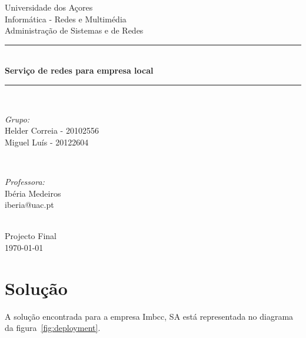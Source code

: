 \documentclass[12pt,a4paper]{report}
\begin{document}
\begin{titlepage}

\newcommand{\HRule}{\rule{\linewidth}{0.5mm}} %

\center

\LARGE Universidade dos Açores\\[0.5cm]
\Large Informática - Redes e Multimédia\\[1.5cm]
\large Administração de Sistemas e de Redes\\[0.5cm]

\HRule \\[0.4cm]
{ \LARGE \bfseries Serviço de redes para empresa local}\\[0.4cm]
\HRule \\[1.5cm]

\begin{minipage}{0.4\textwidth}
\begin{flushleft} \large
\emph{Grupo:}\\
\small Helder Correia - 20102556\\
\small Miguel Luís - 20122604\\
\end{flushleft}
\end{minipage}
~
\begin{minipage}{0.4\textwidth}
\begin{flushright} \large
\emph{Professora:}\\
\small Ibéria Medeiros\\
\small iberia@uac.pt
\end{flushright}
\end{minipage}\\[4cm]

{\Large Projecto Final}\\[0.5cm]
{\large \today}\\[3cm]

\vfill %

\end{titlepage}

\tableofcontents

\chapter{Solução}

A solução encontrada para a empresa Imbcc, SA está representada no diagrama da figura~\ref{fig:deployment}.
\end{document}
